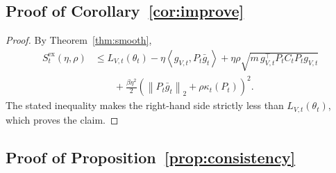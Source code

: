 \documentclass{article}
\newcommand{\norm}[1]{\left\lVert #1 \right\rVert}
\newcommand{\inner}[2]{\left\langle #1, #2 \right\rangle}
\begin{document}
\subsection{Proof of Corollary~\ref{cor:improve}}

\begin{proof}
By Theorem~\ref{thm:smooth},
\begin{align}
    S_t^{\mathrm{ex}}(\eta,\rho)
    &\le
    L_{V,t}(\theta_t)
    -
    \eta \inner{g_{V,t}}{P_t \bar g_t}
    +
    \eta \rho \sqrt{m\, g_{V,t}^\top P_t C_t P_t g_{V,t}} \nonumber\\
    &\qquad +
    \frac{\beta \eta^2}{2}
    \left(
        \norm{P_t \bar g_t}_2 + \rho \kappa_t(P_t)
    \right)^2.
\end{align}
The stated inequality makes the right-hand side strictly less than $L_{V,t}(\theta_t)$, which proves the claim.
\end{proof}

\subsection{Proof of Proposition~\ref{prop:consistency}}
\end{document}

